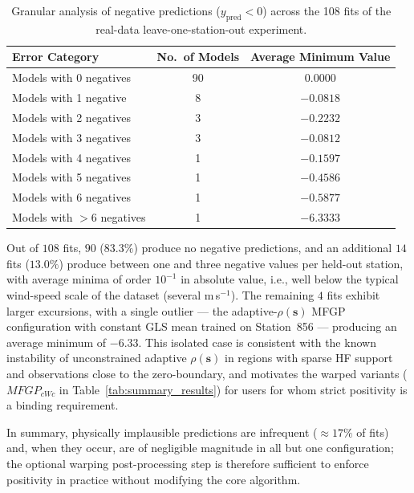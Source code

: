 \documentclass[12pt]{article}
\begin{document}
\begin{table}[h]
\centering
\caption{Granular analysis of negative predictions ($y_{\text{pred}}<0$) across the 108 fits of the real-data leave-one-station-out experiment.}
\label{tab:detailed_negatives}
\begin{tabular}{@{}lcc@{}}
\toprule
\textbf{Error Category} & \textbf{No.\ of Models} & \textbf{Average Minimum Value} \\ \midrule
Models with 0 negatives    & 90 & \phantom{$-$}0.0000 \\
Models with 1 negative     & 8  & $-0.0818$ \\
Models with 2 negatives    & 3  & $-0.2232$ \\
Models with 3 negatives    & 3  & $-0.0812$ \\
Models with 4 negatives    & 1  & $-0.1597$ \\
Models with 5 negatives    & 1  & $-0.4586$ \\
Models with 6 negatives    & 1  & $-0.5877$ \\
Models with $>6$ negatives & 1  & $-6.3333$ \\ \bottomrule
\end{tabular}
\end{table}

Out of $108$ fits, $90$ ($83.3\%$) produce no negative predictions, and an additional $14$ fits ($13.0\%$) produce between one and three negative values per held-out station, with average minima of order $10^{-1}$ in absolute value, i.e., well below the typical wind-speed scale of the dataset (several m\,s$^{-1}$). The remaining $4$ fits exhibit larger excursions, with a single outlier --- the adaptive-$\rho(\bm{s})$ MFGP configuration with constant GLS mean trained on Station~856 --- producing an average minimum of $-6.33$. This isolated case is consistent with the known instability of unconstrained adaptive $\rho(\bm{s})$ in regions with sparse HF support and observations close to the zero-boundary, and motivates the warped variants ($MFGP_{cWc}$ in Table~\ref{tab:summary_results}) for users for whom strict positivity is a binding requirement.

In summary, physically implausible predictions are infrequent ($\approx 17\%$ of fits) and, when they occur, are of negligible magnitude in all but one configuration; the optional warping post-processing step is therefore sufficient to enforce positivity in practice without modifying the core algorithm.

\clearpage
\end{document}
